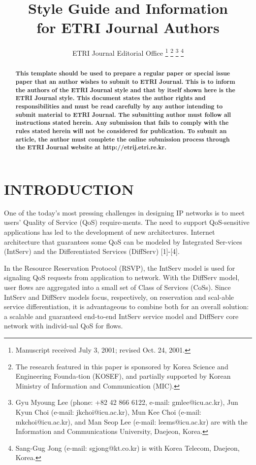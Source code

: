 \documentclass[10pt, twocolumn, twoside]{etri}
\begin{document}
\title{Style Guide and Information \\
for ETRI Journal Authors}
\author{ETRI Journal Editorial Office%
\thanks{Manuscript received July 3, 2001; revised Oct. 24, 2001.}%
\thanks{The research featured in this paper is sponsored by Korea Science and
Engineering Founda-tion (KOSEF), and partially supported by Korean Ministry of
Information and Communication (MIC).}%
\thanks{Gyu Myoung Lee (phone: +82 42 866 6122, e-mail: gmlee@icu.ac.kr),
Jun Kyun Choi (e-mail: jkchoi@icu.ac.kr), Mun Kee Choi (e-mail:
mkchoi@icu.ac.kr), and Man Seop Lee (e-mail: leems@icu.ac.kr) are with the
Information and Communications University, Daejeon, Korea.}%
\thanks{Sang-Gug Jong (e-mail: sgjong@kt.co.kr) is with Korea Telecom, Daejeon,
Korea.}%
}

\maketitle

\begin{abstract}
\textbf{This template should be used to prepare a regular paper or special issue paper that an author wishes to submit to ETRI Journal. This is to inform the authors of the ETRI Journal style and that by itself shown here is the ETRI Journal style. This document states the author rights and responsibilities and must be read carefully by any author intending to submit material to ETRI Journal. The submitting author must follow all instructions stated herein. Any submission that fails to comply with the rules stated herein will not be considered for publication. To submit an article, the author must complete the online submission process through the ETRI Journal website at http://etrij.etri.re.kr.}
\end{abstract}

\section{INTRODUCTION}

One\cite{One} of the today's most pressing challenges in designing IP networks
is to meet users' Quality of Service (QoS) require-ments. The need to
support QoS-sensitive applications has led to the development of new
architectures. Internet architecture that guarantees some QoS can be
modeled by Integrated Ser-vices (IntServ) and the Differentiated Services
(DiffServ) [1]-[4].

In the Resource Reservation Protocol (RSVP), the IntServ model is
used for signaling QoS requests from application to network. With
the DiffServ model, user flows are aggregated into a small set of
Class of Services (CoSs). Since IntServ and DiffServ models focus,
respectively, on reservation and scal-able service differentiation, it
is advantageous to combine both for an overall solution: a scalable and
guaranteed end-to-end IntServ service model and DiffServ core network
with individ-ual QoS for flows.
\end{document}
